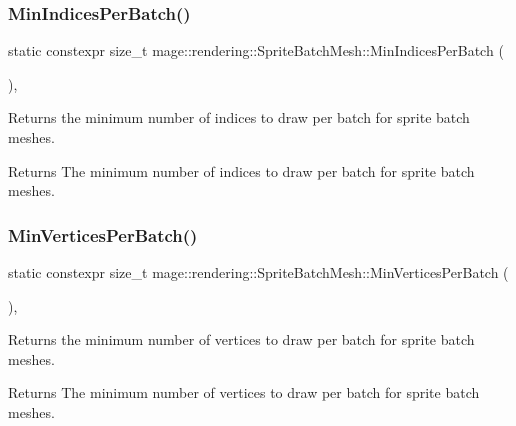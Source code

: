 \subsubsection{\texorpdfstring{Min\+Indices\+Per\+Batch()}{MinIndicesPerBatch()}}
{\footnotesize\ttfamily static constexpr size\+\_\+t mage\+::rendering\+::\+Sprite\+Batch\+Mesh\+::\+Min\+Indices\+Per\+Batch (\begin{DoxyParamCaption}{ }\end{DoxyParamCaption})\hspace{0.3cm}{\ttfamily [static]}, {\ttfamily [noexcept]}}

Returns the minimum number of indices to draw per batch for sprite batch meshes.

\begin{DoxyReturn}{Returns}
The minimum number of indices to draw per batch for sprite batch meshes. 
\end{DoxyReturn}
\mbox{\label{classmage_1_1rendering_1_1_sprite_batch_mesh_ad45b804c25e3b488aa9b22226fbc1ed4}} 
\subsubsection{\texorpdfstring{Min\+Vertices\+Per\+Batch()}{MinVerticesPerBatch()}}
{\footnotesize\ttfamily static constexpr size\+\_\+t mage\+::rendering\+::\+Sprite\+Batch\+Mesh\+::\+Min\+Vertices\+Per\+Batch (\begin{DoxyParamCaption}{ }\end{DoxyParamCaption})\hspace{0.3cm}{\ttfamily [static]}, {\ttfamily [noexcept]}}

Returns the minimum number of vertices to draw per batch for sprite batch meshes.

\begin{DoxyReturn}{Returns}
The minimum number of vertices to draw per batch for sprite batch meshes. 
\end{DoxyReturn}
\mbox{\label{classmage_1_1rendering_1_1_sprite_batch_mesh_a7855038d3367c62dcbb2d3227cdb5c81}} 

